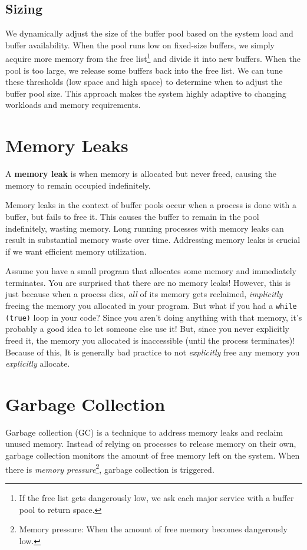 \documentclass{report}
\newcommand{\definitionBegin}[1]{\begin{tcolorbox}[title={Definition: #1}]}
\newcommand{\definitionEnd}{\end{tcolorbox}}
\newcommand{\exampleBegin}[1]{\begin{tcolorbox}[colback=blue!5!white,colframe=black!75!blue,title={Example:
      #1}]}
\newcommand{\exampleEnd}{\end{tcolorbox}}
\begin{document}
\subsection{Sizing}
We dynamically adjust the size of the buffer pool based on the system load and buffer
availability. When the pool runs low on fixed-size buffers, we simply acquire more memory from the
free list\footnote{If the free list gets dangerously low, we ask each major service with a buffer
  pool to return space.} and divide it into new buffers. When the pool is too large, we release some
buffers back into the free list. We can tune these thresholds (low space and high space) to
determine when to adjust the buffer pool size. This approach makes the system highly adaptive to
changing workloads and memory requirements.





\section{Memory Leaks}
\definitionBegin{Memory Leak}
A \textbf{memory leak} is when memory is allocated but never freed, causing the memory to remain
occupied indefinitely.
\definitionEnd

Memory leaks in the context of buffer pools occur when a process is done with a buffer, but fails to
free it. This causes the buffer to remain in the pool indefinitely, wasting memory. Long running
processes with memory leaks can result in substantial memory waste over time. Addressing memory
leaks is crucial if we want efficient memory utilization.

\exampleBegin{Leaky Program}
Assume you have a small program that allocates some memory and immediately terminates. You are
surprised that there are no memory leaks! However, this is just because when a process dies,
\textit{all} of its memory gets reclaimed, \textit{implicitly} freeing the memory you allocated in
your program. But what if you had a \texttt{while (true)} loop in your code? Since you aren't doing
anything with that memory, it's probably a good idea to let someone else use it! But, since you
never explicitly freed it, the memory you allocated is inaccessible (until the process terminates)!
Because of this, It is generally bad practice to not \textit{explicitly} free any memory you
\textit{explicitly} allocate. 
\exampleEnd





\section{Garbage Collection}
Garbage collection (GC) is a technique to address memory leaks and reclaim unused memory. Instead of
relying on processes to release memory on their own, garbage collection monitors the amount of free
memory left on the system. When there is \textit{memory pressure}\footnote{Memory pressure: When the
  amount of free memory becomes dangerously low.}, garbage collection is triggered.
\end{document}
